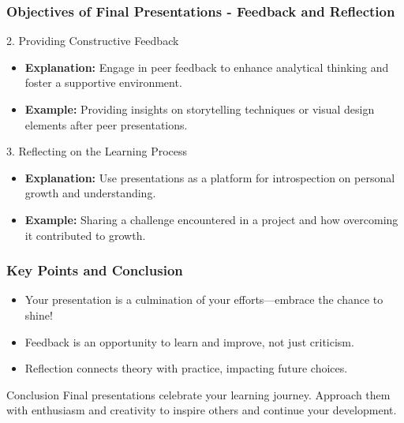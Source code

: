 \documentclass[aspectratio=169]{beamer}
\begin{document}
\begin{frame}[fragile]
    \frametitle{Objectives of Final Presentations - Feedback and Reflection}
    \begin{block}{2. Providing Constructive Feedback}
        \begin{itemize}
            \item \textbf{Explanation:} Engage in peer feedback to enhance analytical thinking and foster a supportive environment.
            \item \textbf{Example:} Providing insights on storytelling techniques or visual design elements after peer presentations.
        \end{itemize}
    \end{block}

    \begin{block}{3. Reflecting on the Learning Process}
        \begin{itemize}
            \item \textbf{Explanation:} Use presentations as a platform for introspection on personal growth and understanding.
            \item \textbf{Example:} Sharing a challenge encountered in a project and how overcoming it contributed to growth.
        \end{itemize}
    \end{block}
\end{frame}

\begin{frame}[fragile]
    \frametitle{Key Points and Conclusion}
    \begin{itemize}
        \item Your presentation is a culmination of your efforts—embrace the chance to shine!
        \item Feedback is an opportunity to learn and improve, not just criticism.
        \item Reflection connects theory with practice, impacting future choices.
    \end{itemize}
    
    \begin{block}{Conclusion}
        Final presentations celebrate your learning journey. Approach them with enthusiasm and creativity to inspire others and continue your development.
    \end{block}
\end{frame}
\end{document}
